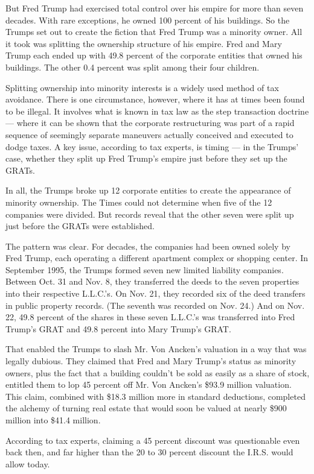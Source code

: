 But Fred Trump had exercised total control over his empire for more than
seven decades. With rare exceptions, he owned 100 percent of his
buildings. So the Trumps set out to create the fiction that Fred Trump
was a minority owner. All it took was splitting the ownership structure
of his empire. Fred and Mary Trump each ended up with 49.8 percent of
the corporate entities that owned his buildings. The other 0.4 percent
was split among their four children.

Splitting ownership into minority interests is a widely used method of
tax avoidance. There is one circumstance, however, where it has at times
been found to be illegal. It involves what is known in tax law as the
step transaction doctrine --- where it can be shown that the corporate
restructuring was part of a rapid sequence of seemingly separate
maneuvers actually conceived and executed to dodge taxes. A key issue,
according to tax experts, is timing --- in the Trumps' case, whether
they split up Fred Trump's empire just before they set up the GRATs.

In all, the Trumps broke up 12 corporate entities to create the
appearance of minority ownership. The Times could not determine when
five of the 12 companies were divided. But records reveal that the other
seven were split up just before the GRATs were established.

The pattern was clear. For decades, the companies had been owned solely
by Fred Trump, each operating a different apartment complex or shopping
center. In September 1995, the Trumps formed seven new limited liability
companies. Between Oct. 31 and Nov. 8, they transferred the deeds to the
seven properties into their respective L.L.C.'s. On Nov. 21, they
recorded six of the deed transfers in public property records. (The
seventh was recorded on Nov. 24.) And on Nov. 22, 49.8 percent of the
shares in these seven L.L.C.'s was transferred into Fred Trump's GRAT
and 49.8 percent into Mary Trump's GRAT.

That enabled the Trumps to slash Mr. Von Ancken's valuation in a way
that was legally dubious. They claimed that Fred and Mary Trump's status
as minority owners, plus the fact that a building couldn't be sold as
easily as a share of stock, entitled them to lop 45 percent off Mr. Von
Ancken's \$93.9 million valuation. This claim, combined with \$18.3
million more in standard deductions, completed the alchemy of turning
real estate that would soon be valued at nearly \$900 million into
\$41.4 million.

According to tax experts, claiming a 45 percent discount was
questionable even back then, and far higher than the 20 to 30 percent
discount the I.R.S. would allow today.

